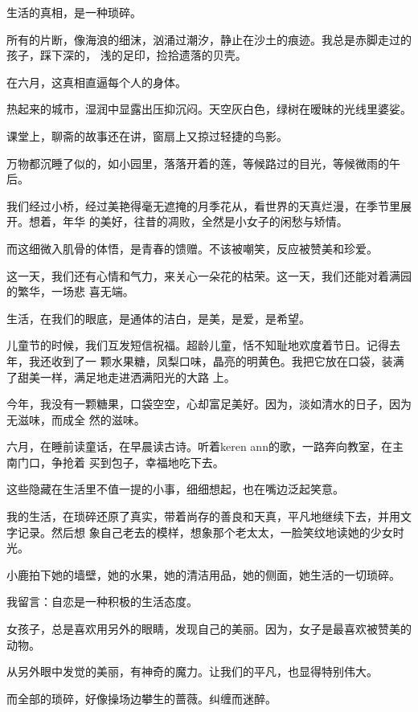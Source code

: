 
		生活的真相，是一种琐碎。

		所有的片断，像海浪的细沫，汹涌过潮汐，静止在沙土的痕迹。我总是赤脚走过的孩子，踩下深的，
	浅的足印，捡拾遗落的贝壳。

		在六月，这真相直逼每个人的身体。\par
		热起来的城市，湿润中显露出压抑沉闷。天空灰白色，绿树在暧昧的光线里婆娑。\par
		课堂上，聊斋的故事还在讲，窗扇上又掠过轻捷的鸟影。

		万物都沉睡了似的，如小园里，落落开着的莲，等候路过的目光，等候微雨的午后。

		我们经过小桥，经过美艳得毫无遮掩的月季花从，看世界的天真烂漫，在季节里展开。想着，年华
	的美好，往昔的凋败，全然是小女子的闲愁与矫情。

		而这细微入肌骨的体悟，是青春的馈赠。不该被嘲笑，反应被赞美和珍爱。

		这一天，我们还有心情和气力，来关心一朵花的枯荣。这一天，我们还能对着满园的繁华，一场悲
	喜无端。

		生活，在我们的眼底，是通体的洁白，是美，是爱，是希望。

		儿童节的时候，我们互发短信祝福。超龄儿童，恬不知耻地欢度着节日。记得去年，我还收到了一
	颗水果糖，凤梨口味，晶亮的明黄色。我把它放在口袋，装满了甜美一样，满足地走进洒满阳光的大路
	上。

		今年，我没有一颗糖果，口袋空空，心却富足美好。因为，淡如清水的日子，因为无滋味，而成全
	然的滋味。

		六月，在睡前读童话，在早晨读古诗。听着keren ann的歌，一路奔向教室，在主南门口，争抢着
	买到包子，幸福地吃下去。

		这些隐藏在生活里不值一提的小事，细细想起，也在嘴边泛起笑意。

		我的生活，在琐碎还原了真实，带着尚存的善良和天真，平凡地继续下去，并用文字记录。然后想
	象自己老去的模样，想象那个老太太，一脸笑纹地读她的少女时光。

		小鹿拍下她的墙壁，她的水果，她的清洁用品，她的侧面，她生活的一切琐碎。\par
		我留言：自恋是一种积极的生活态度。\par
		女孩子，总是喜欢用另外的眼睛，发现自己的美丽。因为，女子是最喜欢被赞美的动物。

		从另外眼中发觉的美丽，有神奇的魔力。让我们的平凡，也显得特别伟大。

		而全部的琐碎，好像操场边攀生的蔷薇。纠缠而迷醉。

